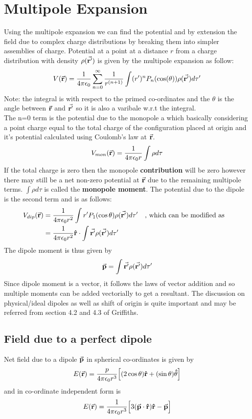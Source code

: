\documentclass[12pt, oneside]{book}
\begin{document}
\section{Multipole Expansion}
Using the multipole expansion we can find the potential and by extension the field due to complex charge distributions by breaking them into simpler assemblies of charge. Potential at a point at a distance $r$ from a charge distribution with density $\rho(\va{r'})$ is given by the multipole expansion as follow:
\begin{equation}
	V(\va{r})=\dfrac{1}{4\pi \epsilon_0}\sum_{n=0}^{\infty}\dfrac{1}{r^{(n+1)}}\int (r')^nP_n(\cos(\theta))\rho(\va{r'})d\tau'
\end{equation}
Note: the integral is with respect to the primed co-ordinates and the $\theta$ is the angle between $\va{r}$ and $\va{r'}$ so it is also a varibale w.r.t the integral. \\

The n=0 term is the potential due to the monopole a which basically considering a point charge equal to the total charge of the configuration placed at origin and it's potential calculated using Coulomb's law at $\va{r}$.
\begin{equation}
	V_{mon}(\va{r})=\dfrac{1}{4\pi \epsilon_0 r}\int\rho d\tau
\end{equation}
If the total charge is zero then the monopole \textbf{contribution} will be zero however there may still be a net non-zero potential at $\va{r}$ due to the remaining multipole terms. $\int\rho d\tau$ is called the \textbf{monopole moment}. The potential due to the dipole is the second term and is as follows:
\begin{align}
	V_{dip}(\va{r})&=\dfrac{1}{4\pi \epsilon_0 r^2}\int r' P_1(\cos\theta)\rho(\va{r'})d\tau' \qq{, which can be modified as} \\
	&=\dfrac{1}{4\pi \epsilon_0 r^2}\vu{r}\cdot\int \va{r'}\rho(\va{r'})d\tau'
\end{align}
The dipole moment is thus given by 
\begin{equation}
	\va{p}=\int \va{r'} \rho(\va{r'})d\tau'
\end{equation}
Since dipole moment is a vector, it follows the laws of vector addition and so multiple moments can be added vectorially to get a resultant. The discussion on physical/ideal dipoles as well as shift of origin is quite important and may be referred from section 4.2 and 4.3 of Griffiths. 

\subsection{Field due to a perfect dipole}
Net field due to a dipole $\va{p}$ in spherical co-ordinates is given by
\begin{equation}
	E(\va{r})=\dfrac{p}{4\pi \epsilon_0 r^3}\Big[(2\cos\theta)\vu{r}+(\sin\theta)\vu{\theta}\Big]
\end{equation}
and in co-ordinate independent form is 
\begin{equation}
	E(\va{r})=\dfrac{1}{4\pi \epsilon_0 r^3}\Big[3(\va{p}\cdot\vu{r})\vu{r}-\va{p}\Big]
\end{equation}
\end{document}
